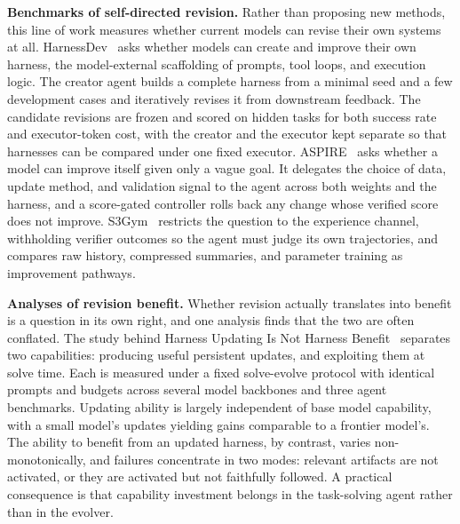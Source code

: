 \noindent\textbf{Benchmarks of self-directed revision.} Rather than proposing new methods, this line of work measures whether current models can revise their own systems at all. HarnessDev~\cite{wu2026harnessdev} asks whether models can create and improve their own harness, the model-external scaffolding of prompts, tool loops, and execution logic. The creator agent builds a complete harness from a minimal seed and a few development cases and iteratively revises it from downstream feedback. The candidate revisions are frozen and scored on hidden tasks for both success rate and executor-token cost, with the creator and the executor kept separate so that harnesses can be compared under one fixed executor. ASPIRE~\cite{wu2026aspire} asks whether a model can improve itself given only a vague goal. It delegates the choice of data, update method, and validation signal to the agent across both weights and the harness, and a score-gated controller rolls back any change whose verified score does not improve. S3Gym~\cite{shi2026s3gym} restricts the question to the experience channel, withholding verifier outcomes so the agent must judge its own trajectories, and compares raw history, compressed summaries, and parameter training as improvement pathways.


\noindent\textbf{Analyses of revision benefit.} Whether revision actually translates into benefit is a question in its own right, and one analysis finds that the two are often conflated. The study behind Harness Updating Is Not Harness Benefit~\cite{lin2026harness} separates two capabilities: producing useful persistent updates, and exploiting them at solve time. Each is measured under a fixed solve-evolve protocol with identical prompts and budgets across several model backbones and three agent benchmarks. Updating ability is largely independent of base model capability, with a small model's updates yielding gains comparable to a frontier model's. The ability to benefit from an updated harness, by contrast, varies non-monotonically, and failures concentrate in two modes: relevant artifacts are not activated, or they are activated but not faithfully followed. A practical consequence is that capability investment belongs in the task-solving agent rather than in the evolver.

